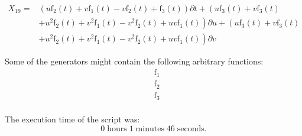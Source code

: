 \begin{align*}
X_{19}=&\left(u \operatorname{f_{2}}{\left(t \right)}+v \operatorname{f_{1}}{\left(t \right)}- v \operatorname{f_{2}}{\left(t \right)}+\operatorname{f_{3}}{\left(t \right)} \right)\partial t+\left(u \operatorname{f_{3}}{\left(t \right)}+v \operatorname{f_{3}}{\left(t \right)}\right.\\
&+\left.u^{2} \operatorname{f_{2}}{\left(t \right)}+v^{2} \operatorname{f_{1}}{\left(t \right)}- v^{2} \operatorname{f_{2}}{\left(t \right)}+u v \operatorname{f_{1}}{\left(t \right)} \right)\partial u+\left(u \operatorname{f_{3}}{\left(t \right)}+v \operatorname{f_{3}}{\left(t \right)}\right.\\
&+\left.u^{2} \operatorname{f_{2}}{\left(t \right)}+v^{2} \operatorname{f_{1}}{\left(t \right)}- v^{2} \operatorname{f_{2}}{\left(t \right)}+u v \operatorname{f_{1}}{\left(t \right)} \right)\partial v
\end{align*}



\noindent Some of the generators might contain the following arbitrary functions:
\begin{align*}
&\operatorname{f_{1}}\\
&\operatorname{f_{2}}\\
&\operatorname{f_{3}}\\
\end{align*}

\noindent The execution time of the script was:
$$0\;\mathrm{hours}\;1\;\mathrm{minutes}\;46 \;\mathrm{seconds}.$$

